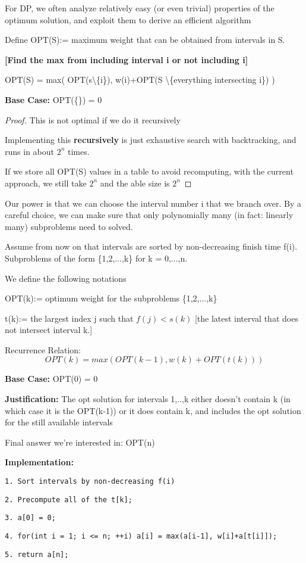 \documentclass[openany]{article}
\begin{document}
\begin{theorem*}{}
    For DP, we often analyze relatively easy (or even trivial) properties of the optimum solution, and exploit them to derive an efficient algorithm
\end{theorem*}
\begin{solution*}{}
    Define OPT(S):= maximum weight that can be obtained from intervals in S.

    \begin{center}
            \textbf{[Find the max from including interval i or not including i]}
    \end{center}
    
    OPT(S) = max( OPT(s\textbackslash \{i\}), w(i)+OPT(S \textbackslash \{everything intersecting i\}) )

    \textbf{Base Case:} OPT(\{\}) = 0

    \begin{proof}{This is not optimal if we do it recursively}
    
        Implementing this \textbf{recursively} is just exhaustive search with backtracking, and runs in about $2^n$ times.

        If we store all OPT(S) values in a table to avoid recomputing, with the current approach, we still take $2^n$ and the able size is $2^n$
    \end{proof}

    Our power is that we can choose the interval number i that we branch over. By a careful choice, we can make sure that only polynomially many (in fact: linearly many) subproblems need to solved.

    Assume from now on that intervals are sorted by non-decreasing finish time f(i). Subproblems of the form \{1,2,...,k\} for k = 0,...,n.

    We define the following notations
    
    OPT(k):= optimum weight for the subproblems \{1,2,...,k\}
    
    t(k):= the largest index j such that $f(j) < s(k)$ [the latest interval that does not intersect interval k.]
    
    Recurrence Relation:
    \[OPT(k) = max(OPT(k-1), w(k)+OPT(t(k)))\]

    \textbf{Base Case:} OPT(0) = 0
    
    \textbf{Justification:} The opt solution for intervals 1,..,k either doesn't contain k (in which case it is the OPT(k-1)) or it does contain k, and includes the opt solution for the still available intervals

    Final answer we're interested in: OPT(n)

    \textbf{Implementation:}

    \qquad \texttt{1. Sort intervals by non-decreasing f(i)}
    
    \qquad \texttt{2. Precompute all of the t[k];}
    
    \qquad \texttt{3. a[0] = 0;}
    
    \qquad \texttt{4. for(int i = 1; i <= n; ++i) a[i] = max(a[i-1], w[i]+a[t[i]]);}
    
    \qquad \texttt{5. return a[n];}
\end{solution*}
\end{document}
